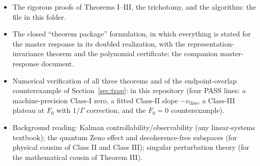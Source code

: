 \documentclass[11pt]{article}
\newcommand{\nudiss}{\nu_{\mathrm{diss}}}
\begin{document}
\begin{itemize}
\item The rigorous proofs of Theorems I--III, the trichotomy, and the
algorithm: the file  in this folder.
\item The closed ``theorem package'' formulation, in which everything is
stated for the master response in its doubled realization, with the
representation-invariance theorem and the polynomial certificate:
the companion master-response document.
\item Numerical verification of all three theorems and of the
endpoint-overlap counterexample of Section~\ref{sec:trap}:
 in this repository
(four PASS lines: a machine-precision Class-I zero, a fitted Class-II slope
$-\nudiss$, a Class-III plateau at $F_0$ with $1/\Gamma$ correction, and the
$F_0=0$ counterexample).
\item Background reading: Kalman controllability/observability (any
linear-systems textbook); the quantum Zeno effect and decoherence-free
subspaces (for physical cousins of Class II and Class III); singular
perturbation theory (for the mathematical cousin of Theorem III).
\end{itemize}
\end{document}
